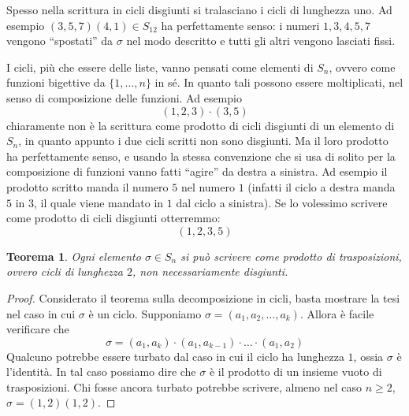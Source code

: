 \documentclass[11pt]{article}
\theoremstyle{plain}
\newtheorem{thm}{Teorema}[section]
\theoremstyle{definition}
\theoremstyle{remark}
\begin{document}
Spesso nella scrittura in cicli disgiunti si tralasciano i cicli di lunghezza uno. Ad esempio $(3,5,7)(4,1)\in S_{12}$ ha perfettamente senso:
i numeri $1,3,4,5,7$ vengono ``spostati'' da $\sigma$ nel modo descritto e tutti gli altri vengono lasciati fissi.

I cicli, più che essere delle liste, vanno pensati come elementi di $S_n$, ovvero come funzioni bigettive da $\{1,\dots,n\}$ in sé.
In quanto tali possono essere moltiplicati, nel senso di composizione delle funzioni. Ad esempio
\[(1,2,3)\cdot(3,5)\]
chiaramente non è la scrittura come prodotto di cicli disgiunti di un elemento di $S_n$, in quanto appunto i due cicli scritti
non sono disgiunti. Ma il loro prodotto ha perfettamente senso, e usando la stessa convenzione
che si usa di solito per la composizione di funzioni vanno fatti ``agire'' da destra a sinistra.
Ad esempio il prodotto scritto manda il numero $5$ nel numero $1$ (infatti il ciclo a destra manda $5$ in $3$, il quale viene mandato in $1$ dal ciclo
a sinistra). Se lo volessimo scrivere come prodotto di cicli disgiunti otterremmo:
\[(1,2,3,5)\]

\begin{thm}
Ogni elemento $\sigma \in S_n$ si può scrivere come prodotto di \emph{trasposizioni}, ovvero cicli di lunghezza $2$, non necessariamente disgiunti.
\end{thm}
\begin{proof}
Considerato il teorema sulla decomposizione in cicli, basta mostrare la tesi nel caso in cui $\sigma$ è un ciclo.
Supponiamo $\sigma = (a_1, a_2, \dots, a_k)$. Allora è facile verificare che
\[\sigma = (a_1, a_k)\cdot (a_1, a_{k-1}) \cdot \dots \cdot (a_1, a_2)\]
Qualcuno potrebbe essere turbato dal caso in cui il ciclo ha lunghezza $1$, ossia $\sigma$ è l'identità.
In tal caso possiamo dire che $\sigma$ è il prodotto di un insieme vuoto di trasposizioni.
Chi fosse ancora turbato potrebbe scrivere, almeno nel caso $n\ge 2$, $\sigma = (1,2)(1,2)$.
\end{proof}
\end{document}
